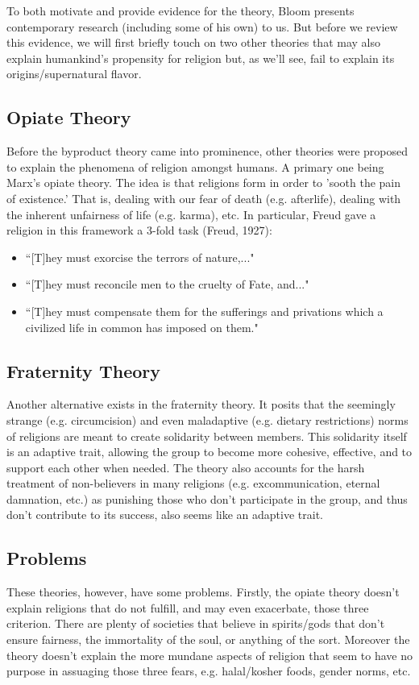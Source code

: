 \documentclass{article}
\begin{document}
To both motivate and provide evidence for the theory, Bloom presents contemporary research (including some of his own) to us. But before we review this evidence, we will first briefly touch on two other theories that may also explain humankind's propensity for religion but, as we'll see, fail to explain its origins/supernatural flavor.

\subsection{Opiate Theory}
Before the byproduct theory came into prominence, other theories were proposed to explain the phenomena of religion amongst humans. A primary one being Marx's opiate theory. The idea is that religions form in order to 'sooth the pain of existence.' That is, dealing with our fear of death (e.g. afterlife), dealing with the inherent unfairness of life (e.g. karma), etc. In particular, Freud gave a religion in this framework a 3-fold task (Freud, 1927):

\begin{itemize}
	\item ``[T]hey must exorcise the terrors of nature,..."
	\item ``[T]hey must reconcile men to the cruelty of Fate, and..."
	\item ``[T]hey must compensate them for the sufferings and privations which a civilized life in common has imposed on them."
\end{itemize}

\subsection{Fraternity Theory}
Another alternative exists in the fraternity theory. It posits that the seemingly strange (e.g. circumcision) and even maladaptive (e.g. dietary restrictions) norms of religions are meant to create solidarity between members. This solidarity itself is an adaptive trait, allowing the group to become more cohesive, effective, and to support each other when needed. The theory also accounts for the harsh treatment of non-believers in many religions (e.g. excommunication, eternal damnation, etc.) as punishing those who don't participate in the group, and thus don't contribute to its success, also seems like an adaptive trait.

\subsection{Problems}
These theories, however, have some problems. Firstly, the opiate theory doesn't explain religions that do not fulfill, and may even exacerbate, those three criterion. There are plenty of societies that believe in spirits/gods that don't ensure fairness, the immortality of the soul, or anything of the sort. Moreover the theory doesn't explain the more mundane aspects of religion that seem to have no purpose in assuaging those three fears, e.g. halal/kosher foods, gender norms, etc.
\end{document}
